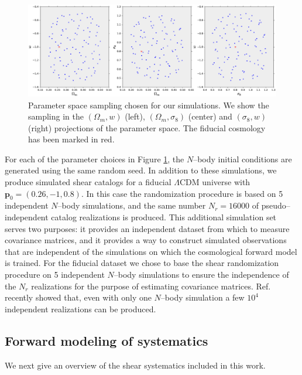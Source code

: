 \documentclass[reprint,aps,prd,superscriptaddress,showkeys,showpacs]{revtex4-1}
\newcommand{\bb}[1]{\mathbf{#1}}
\begin{document}
\begin{figure}
\includegraphics[scale=0.35]{Figures/design.eps}
\caption{Parameter space sampling chosen for our simulations. We show the sampling in the $(\Omega_m,w)$ (left), $(\Omega_m,\sigma_8)$ (center) and $(\sigma_8,w)$ (right) projections of the parameter space. The fiducial cosmology has been marked in red.}
\label{fig:simdesign}
\end{figure}
%
For each of the parameter choices in Figure \ref{fig:simdesign}, the $N$--body initial conditions are generated using the same random seed. In addition to these simulations, we produce simulated shear catalogs for a fiducial $\Lambda$CDM universe with $\bb{p}_0=(0.26,-1,0.8)$. In this case the randomization procedure is based on 5 independent $N$--body simulations, and the same number $N_r=16000$ of pseudo--independent catalog realizations is produced. This additional simulation set serves two purposes: it provides an independent dataset from which to measure covariance matrices, and it provides a way to construct simulated observations that are independent of the simulations on which the cosmological forward model is trained. For the fiducial dataset we chose to base the shear randomization procedure on 5 independent $N$--body simulations to ensure the independence of the $N_r$ realizations for the purpose of estimating covariance matrices. Ref. \citep{PetriVariance} recently showed that, even with only one $N$--body simulation a few $10^4$ independent realizations can be produced.   


\subsection{Forward modeling of systematics}
We next give an overview of the shear systematics included in this work. 
\end{document}
